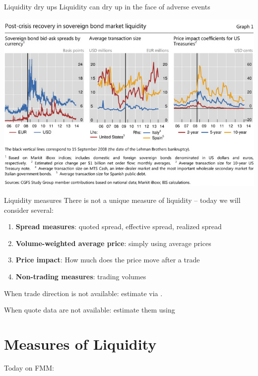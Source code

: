 \begin{frame}{Liquidity dry ups}
	Liquidity can dry up in the face of adverse events
	\begin{center}
		\includegraphics[scale=0.4]{pics/L2_liquiditylehman}
	\end{center}
\end{frame}


\begin{frame}{Liquidity measures}
	There is not a unique measure of liquidity -- today we will consider several:
	\begin{enumerate}
		\item \textbf{Spread measures}: quoted spread, effective spread, realized spread
		\item \textbf{Volume-weighted average price}: simply using average prices
		\item \textbf{Price impact}: How much does the price move after a trade
		\item \textbf{Non-trading measures}: trading volumes
	\end{enumerate}

	When trade direction is not available: estimate via . 
	
	When quote data are not available: estimate them using 
\end{frame}



\section{Measures of Liquidity}

\begin{frame}{Today on FMM:}
	\tableofcontents[currentsection]
\end{frame}


